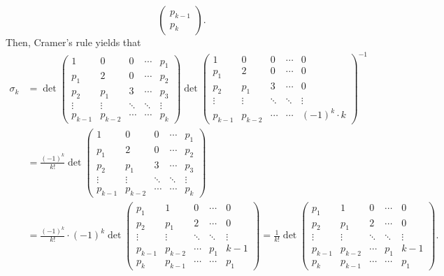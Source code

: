 \documentclass[letterpaper, 11pt, oneside]{book}
\begin{document}
\begin{sol}
\[\begin{pmatrix}
    p_{k - 1} \\
    p_{k}
  \end{pmatrix}.
\]
Then, Cramer's rule yields that
\begin{align*}
  \sigma_{k} &=
  \det
  \begin{pmatrix}
    1 & 0 & 0 & \cdots & p_{1} \\
    p_{1} & 2 & 0 & \cdots & p_{2} \\
    p_{2} & p_{1} & 3 & \cdots & p_{3} \\
    \vdots & \vdots & \ddots & \ddots & \vdots \\
    p_{k - 1} & p_{k - 2} & \cdots & \cdots & p_{k}
  \end{pmatrix}
  \det
  \begin{pmatrix}
    1 & 0 & 0 & \cdots & 0 \\
    p_{1} & 2 & 0 & \cdots & 0 \\
    p_{2} & p_{1} & 3 & \cdots & 0 \\
    \vdots & \vdots & \ddots & \ddots & \vdots \\
    p_{k - 1} & p_{k - 2} & \cdots & \cdots & (-1)^{k} \cdot k
  \end{pmatrix}^{-1} \\
    &= \frac{(-1)^{k}}{k!}
  \det
  \begin{pmatrix}
    1 & 0 & 0 & \cdots & p_{1} \\
    p_{1} & 2 & 0 & \cdots & p_{2} \\
    p_{2} & p_{1} & 3 & \cdots & p_{3} \\
    \vdots & \vdots & \ddots & \ddots & \vdots \\
    p_{k - 1} & p_{k - 2} & \cdots & \cdots & p_{k}
  \end{pmatrix} \\
    &= \frac{(-1)^{k}}{k!} \cdot (-1)^{k}
  \det
  \begin{pmatrix}
    p_{1} & 1 & 0 & \cdots & 0 \\
    p_{2} & p_{1} & 2 & \cdots & 0 \\
    \vdots & \vdots & \ddots & \ddots & \vdots \\
    p_{k - 1} & p_{k - 2} & \cdots & p_{1} & k - 1 \\
    p_{k} & p_{k - 1} & \cdots & \cdots & p_{1}
  \end{pmatrix}
     = \frac{1}{k!}
  \det
  \begin{pmatrix}
    p_{1} & 1 & 0 & \cdots & 0 \\
    p_{2} & p_{1} & 2 & \cdots & 0 \\
    \vdots & \vdots & \ddots & \ddots & \vdots \\
    p_{k - 1} & p_{k - 2} & \cdots & p_{1} & k - 1 \\
    p_{k} & p_{k - 1} & \cdots & \cdots & p_{1}
  \end{pmatrix}.
\end{align*}
\end{sol}
\end{document}
